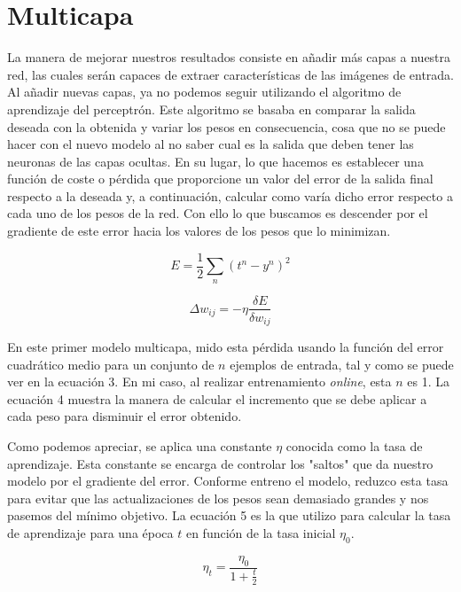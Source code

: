 \section{Multicapa}
La manera de mejorar nuestros resultados consiste en añadir más capas a nuestra red, las cuales serán capaces de extraer características de las imágenes de entrada. Al añadir nuevas capas, ya no podemos seguir utilizando el algoritmo de aprendizaje del perceptrón. Este algoritmo se basaba en comparar la salida deseada con la obtenida y variar los pesos en consecuencia, cosa que no se puede hacer con el nuevo modelo al no saber cual es la salida que deben tener las neuronas de las capas ocultas. En su lugar, lo que hacemos es establecer una función de coste o pérdida que proporcione un valor del error de la salida final respecto a la deseada y, a continuación, calcular como varía dicho error respecto a cada uno de los pesos de la red. Con ello lo que buscamos es descender por el gradiente de este error hacia los valores de los pesos que lo minimizan.

\begin{equation}
    E = \frac{1}{2} \sum_{n} (t^n-y^n)^2
\end{equation}

\begin{equation}
    \Delta w_{ij} = - \eta \frac{\delta E}{\delta w_{ij}}
\end{equation}

En este primer modelo multicapa, mido esta pérdida usando la función del error cuadrático medio para un conjunto de $n$ ejemplos de entrada, tal y como se puede ver en la ecuación 3. En mi caso, al realizar entrenamiento \textit{online}, esta $n$ es 1. La ecuación 4 muestra la manera de calcular el incremento que se debe aplicar a cada peso para disminuir el error obtenido.

Como podemos apreciar, se aplica una constante $\eta$ conocida como la tasa de aprendizaje. Esta constante se encarga de controlar los "saltos" que da nuestro modelo por el gradiente del error. Conforme entreno el modelo, reduzco esta tasa para evitar que las actualizaciones de los pesos sean demasiado grandes y nos pasemos del mínimo objetivo. La ecuación 5 es la que utilizo para calcular la tasa de aprendizaje para una época $t$ en función de la tasa inicial $\eta_0$.

\begin{equation}
    \eta_t = \frac{\eta_0}{1 + \frac{t}{2}}
\end{equation}


